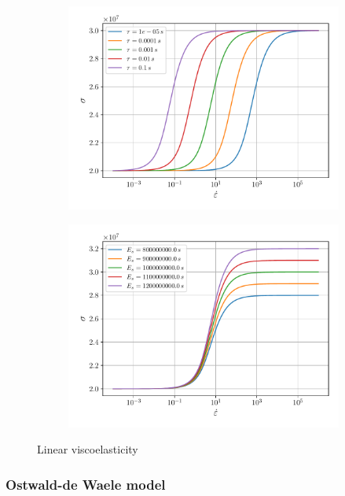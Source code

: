 \documentclass[12pt]{article}
\begin{document}
\begin{figure}[!htb]
	\begin{subfigure}{0.48\textwidth}
		\centering
		\includegraphics[width=\linewidth]{e-dot-stress-tau}
		\caption{ }
	\end{subfigure}
	\begin{subfigure}{0.48\textwidth}
		\centering
		\includegraphics[width=\linewidth]{e-dot-stress-E}
		\caption{ }
	\end{subfigure}
	\caption{Linear viscoelasticity}
\end{figure}

\subsubsection{Ostwald-de Waele model}
\end{document}
